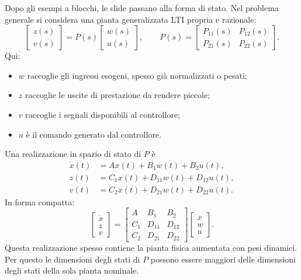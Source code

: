 \documentclass[11pt,a4paper]{article}
\begin{document}
Dopo gli esempi a blocchi, le slide passano alla forma di stato. Nel problema generale si considera una pianta generalizzata LTI propria e razionale:
$$
\begin{bmatrix}
z(s)\\
v(s)
\end{bmatrix}
=
P(s)
\begin{bmatrix}
w(s)\\
u(s)
\end{bmatrix},
\qquad
P(s)=
\begin{bmatrix}
P_{11}(s) & P_{12}(s)\\
P_{21}(s) & P_{22}(s)
\end{bmatrix}.
$$
Qui:
\begin{itemize}
    \item $w$ raccoglie gli ingressi esogeni, spesso gi\`a normalizzati o pesati;
    \item $z$ raccoglie le uscite di prestazione da rendere piccole;
    \item $v$ raccoglie i segnali disponibili al controllore;
    \item $u$ \`e il comando generato dal controllore.
\end{itemize}

Una realizzazione in spazio di stato di $P$ \`e
$$
\begin{aligned}
\dot{x}(t)&=Ax(t)+B_1w(t)+B_2u(t),\\
z(t)&=C_1x(t)+D_{11}w(t)+D_{12}u(t),\\
v(t)&=C_2x(t)+D_{21}w(t)+D_{22}u(t).
\end{aligned}
$$
In forma compatta:
$$
\left[
\begin{array}{c}
\dot{x}\\
z\\
v
\end{array}
\right]
=
\left[
\begin{array}{c|cc}
A & B_1 & B_2\\
\hline
C_1 & D_{11} & D_{12}\\
C_2 & D_{21} & D_{22}
\end{array}
\right]
\left[
\begin{array}{c}
x\\
w\\
u
\end{array}
\right].
$$
Questa realizzazione spesso contiene la pianta fisica aumentata con pesi dinamici. Per questo le dimensioni degli stati di $P$ possono essere maggiori delle dimensioni degli stati della sola pianta nominale.
\end{document}
